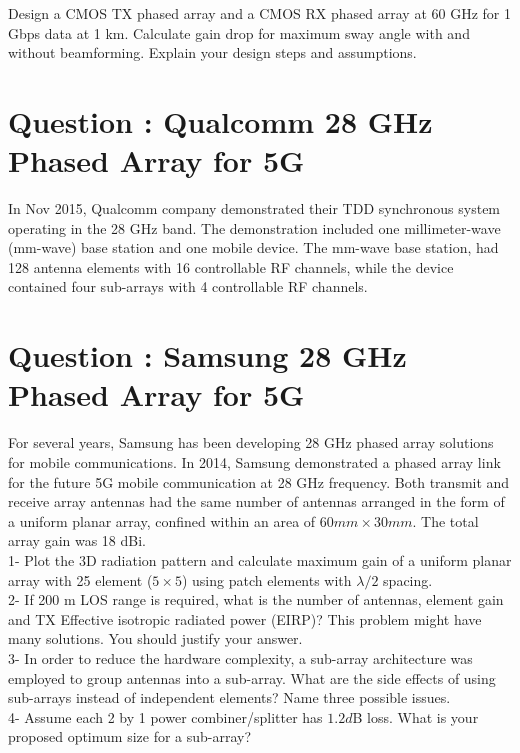 \documentclass[12pt,onecolumn,a4paper]{article}
\newcommand\question[1][\space]{
	\section[Question \numberstringnum{\thesection}]
	{Question \numberstringnum{\thesection}: #1}
}
\begin{document}
Design a CMOS TX phased array and a CMOS RX phased array at 60 GHz for 1 Gbps data at 1 km. Calculate gain drop for maximum sway angle with and without beamforming. Explain your design steps and assumptions. 






\FloatBarrier\question[Qualcomm 28 GHz Phased Array for 5G]



In Nov 2015, Qualcomm company demonstrated their TDD synchronous system operating in the 28 GHz band. The demonstration included one millimeter-wave (mm-wave) base station and one mobile device. The mm-wave base station, had 128 antenna elements with 16 controllable RF channels, while the device contained four sub-arrays with 4 controllable RF channels.\\














\FloatBarrier\question[Samsung 28 GHz Phased Array for 5G]


{\color{questioncolor}
For several years, Samsung has been developing 28 GHz phased array solutions for mobile communications. In 2014, Samsung demonstrated a phased array link for the future 5G mobile communication at 28 GHz frequency. Both transmit and receive array antennas had the same number of antennas arranged in the form of a uniform planar array, confined within an area of $60 mm
\times 30 mm$. The total array gain was 18 dBi.\\

1- Plot the 3D radiation pattern and calculate maximum gain of a uniform planar array with 25 element ($5\times 5$) using patch elements with $\lambda/2$ spacing. \\

2- If 200 m LOS range is required, what is the number of antennas, element gain and TX Effective isotropic radiated power (EIRP)? This problem might have many solutions. You should justify your answer.\\

3- In order to reduce the hardware complexity, a sub-array architecture was employed to group antennas into a sub-array. What are the side effects of using sub-arrays instead of independent elements? Name three possible issues.\\

4- Assume each 2 by 1 power combiner/splitter has $1.2 d$B loss. What is your proposed optimum size for a sub-array?\\

}
\end{document}
